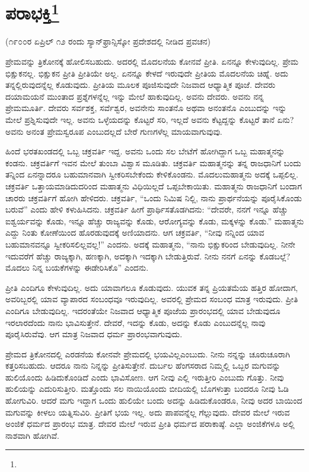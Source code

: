 
\chapter[ಪರಾಭಕ್ತಿ]{ಪರಾಭಕ್ತಿ\protect\footnote{}}

\begin{center}
(೧೯೦೦ರ ಏಪ್ರಿಲ್ ೧೨ ರಂದು ಸ್ಯಾನ್‌ಫ್ರಾನ್ಸಿಸ್ಕೋ ಪ್ರದೇಶದಲ್ಲಿ ನೀಡಿದ ಪ್ರವಚನ)
\end{center}

ಪ್ರೇಮವನ್ನು ತ್ರಿಕೋನಕ್ಕೆ ಹೋಲಿಸಬಹುದು. ಅದರಲ್ಲಿ ಮೊದಲನೆಯ ಕೋನವೆ ಪ್ರೀತಿ. ಏನನ್ನೂ ಕೇಳುವುದಿಲ್ಲ. ಪ್ರೇಮ ಭಿಕ್ಷುಕನಲ್ಲ. ಭಿಕ್ಷುಕನ ಪ್ರೀತಿ ಪ್ರೀತಿಯೇ ಅಲ್ಲ. ಏನನ್ನೂ ಕೇಳದೆ ಇರುವುದೇ ಪ್ರೀತಿಯ ಮೊದಲನೆಯ ಚಿಹ್ನೆ. ಅದು ತನ್ನಲ್ಲಿರುವುದನ್ನೆಲ್ಲ ಕೊಡುವುದು. ಪ್ರೀತಿಯ ಮೂಲಕ ಪೂಜಿಸುವುದೇ ನಿಜವಾದ ಆಧ್ಯಾತ್ಮಿಕ ಪೂಜೆ. ದೇವರು ದಯಾಮಯನೆ ಮುಂತಾದ ಪ್ರಶ್ನೆಗಳನ್ನೆಲ್ಲ ಇನ್ನು ಮೇಲೆ ಹಾಕುವುದಿಲ್ಲ. ಅವನು ದೇವರು. ಅವನು ನನ್ನ ಪ್ರೇಮಮೂರ್ತಿ. ದೇವರು ಸರ್ವಶಕ್ತ, ಸರ್ವೆಶ್ವರ, ಅವನೇನು ಸಾಂತನೊ ಅಥವಾ ಅನಂತನೊ ಎಂಬುದನ್ನು ಇನ್ನು ಮೇಲೆ ಪ್ರಶ್ನಿಸುವುದೇ ಇಲ್ಲ. ಅವನು ಒಳ್ಳೆಯದನ್ನು ಕೊಟ್ಟರೆ ಸರಿ, ಇಲ್ಲದೆ ಅವನು ಕೆಟ್ಟದ್ದನ್ನು ಕೊಟ್ಟರೆ ತಾನೆ ಏನು? ಅವನು ಅನಂತ ಪ್ರೇಮಸ್ವರೂಪ ಎಂಬುದಲ್ಲದೆ ಬೇರೆ ಗುಣಗಳೆಲ್ಲ ಮಾಯವಾಗುವುವು.

ಹಿಂದೆ ಭರತಖಂಡದಲ್ಲಿ ಒಬ್ಬ ಚಕ್ರವರ್ತಿ ಇದ್ದ. ಅವನು ಒಂದು ಸಲ ಬೇಟೆಗೆ ಹೋಗಿದ್ದಾಗ ಒಬ್ಬ ಮಹಾತ್ಮನನ್ನು ಕಂಡನು. ಚಕ್ರವರ್ತಿಗೆ ಇವನ ಮೇಲೆ ತುಂಬಾ ವಿಶ್ವಾಸ ಮೂಡಿತು. ಚಕ್ರವರ್ತಿ ಮಹಾತ್ಮನನ್ನು ತನ್ನ ರಾಜಧಾನಿಗೆ ಬಂದು ತನ್ನಿಂದ ಏನನ್ನಾದರೂ ಬಹುಮಾನವಾಗಿ ಸ್ವೀಕರಿಸಬೇಕೆಂದು ಕೇಳಿಕೊಂಡನು. ಮೊದಲು\break ಮಹಾತ್ಮನು ಅದಕ್ಕೆ ಒಪ್ಪಲಿಲ್ಲ. ಚಕ್ರವರ್ತಿ ಒತ್ತಾಯಮಾಡಿದುದರಿಂದ ಮಹಾತ್ಮನು ವಿಧಿಯಿಲ್ಲದೆ ಒಪ್ಪಬೇಕಾಯಿತು. ಮಹಾತ್ಮನು ರಾಜಧಾನಿಗೆ ಬಂದಾಗ ಚಾರರು ಚಕ್ರವರ್ತಿಗೆ ಹೋಗಿ ಹೇಳಿದರು. ಚಕ್ರವರ್ತಿ, “ಒಂದು ನಿಮಿಷ ನಿಲ್ಲಿ, ನಾನು ಪ್ರಾರ್ಥನೆಯನ್ನು ಪೂರೈಸಿಕೊಂಡು ಬರುವೆ'' ಎಂದು ಹೇಳಿ ಕಳುಹಿಸಿದನು. ಚಕ್ರವರ್ತಿ ಹೀಗೆ ಪ್ರಾರ್ಥಿಸತೊಡಗಿದನು: “ದೇವರೇ, ನನಗೆ ಇನ್ನೂ ಹೆಚ್ಚು ಐಶ್ವರ್ಯವನ್ನು ಕೊಡು, ಇನ್ನೂ ಹೆಚ್ಚು ರಾಜ್ಯವನ್ನು ಕೊಡು, ಆರೋಗ್ಯವನ್ನು ಕೊಡು, ಮಕ್ಕಳನ್ನು ಕೊಡು.” ಮಹಾತ್ಮನು ಎದ್ದು ನಿಂತು ಕೋಣೆಯಿಂದ ಹೊರಡುವುದಕ್ಕೆ ಅಣಿಯಾದನು. ಆಗ ಚಕ್ರವರ್ತಿ, “ನೀವು ನನ್ನಿಂದ ಯಾವ ಬಹುಮಾನವನ್ನೂ ಸ್ವೀಕರಿಸಲಿಲ್ಲವಲ್ಲ!'' ಎಂದನು. ಅದಕ್ಕೆ ಮಹಾತ್ಮನು, “ನಾನು ಭಿಕ್ಷುಕರಿಂದ ಬೇಡುವುದಿಲ್ಲ. ನೀನೇ ಇದುವರೆಗೆ ಹೆಚ್ಚು ರಾಜ್ಯಕ್ಕಾಗಿ, ಹಣಕ್ಕಾಗಿ, ಅದಕ್ಕಾಗಿ ಇದಕ್ಕಾಗಿ ಬೇಡುತ್ತಿರುವೆ. ನೀನು ನನಗೆ ಏನನ್ನು ಕೊಡಬಲ್ಲೆ? ಮೊದಲು ನಿನ್ನ ಬಯಕೆಗಳನ್ನು ಈಡೇರಿಸಿಕೊ” ಎಂದನು.

ಪ್ರೀತಿ ಎಂದಿಗೂ ಕೇಳುವುದಿಲ್ಲ. ಅದು ಯಾವಾಗಲೂ ಕೊಡುವುದು. ಯುವಕ ತನ್ನ ಪ್ರಿಯತಮೆಯ ಹತ್ತಿರ ಹೋದಾಗ, ಅವರಿಬ್ಬರಲ್ಲಿ ಯಾವ ವ್ಯಾಪಾರದ ಸಂಬಂಧವೂ ಇರುವುದಿಲ್ಲ. ಅವರಲ್ಲಿ ಪ್ರೇಮದ ಸಂಬಂಧ ಮಾತ್ರ ಇರುವುದು. ಪ್ರೀತಿ ಎಂದಿಗೂ ಬೇಡುವುದಿಲ್ಲ. ಇದರಂತೆಯೇ ನಿಜವಾದ ಆಧ್ಯಾತ್ಮಿಕ ಪೂಜೆಯ ಪ್ರಾರಂಭದಲ್ಲಿ ಯಾವ ಬೇಡುವುದೂ ಇರಲಾರದೆಂದು ನಾನು ಭಾವಿಸುತ್ತೇನೆ. ದೇವರೆ, ಇದನ್ನು ಕೊಡು, ಅದನ್ನು ಕೊಡು ಎಂಬುದನ್ನೆಲ್ಲ ನಾವು ಪೂರೈಸಿರುವೆವು. ಆಗ ಮಾತ್ರ ನಿಜವಾದ ಧರ್ಮ ಪ್ರಾರಂಭವಾಗುವುದು.

ಪ್ರೇಮದ ತ್ರಿಕೋನದಲ್ಲಿ ಎರಡನೆಯ ಕೋನವೇ ಪ್ರೇಮದಲ್ಲಿ ಭಯವಿಲ್ಲ\break ಎಂಬುದು. ನೀನು ನನ್ನನ್ನು ಚೂರುಚೂರಾಗಿ ಕತ್ತರಿಸಬಹುದು. ಆದರೂ ನಾನು ನಿನ್ನನ್ನು ಪ್ರೀತಿಸುತ್ತೇನೆ. ದುರ್ಬಲ ಹೆಂಗಸರಾದ ನಿಮ್ಮಲ್ಲಿ ಒಬ್ಬರ ಮಗುವನ್ನು ಹುಲಿಯೊಂದು ಹಿಡಿದುಕೊಂಡಿದೆ ಎಂದು ಭಾವಿಸೋಣ. ಆಗ ನೀವು ಎಲ್ಲಿ ಇರುತ್ತೀರಿ ಎಂಬುದು ಗೊತ್ತು. ನೀವು ಹುಲಿಯನ್ನು ಎದುರಿಸುತ್ತೀರಿ. ಮತ್ತೊಂದು ಸಲ ನಾಯಿಯೊಂದು ಬೀದಿಯಲ್ಲಿ ಬೊಗಳುತ್ತಾ ಬಂದರೂ ನೀವು ಓಡಿ ಹೋಗುವಿರಿ. ಆದರೆ ಮಗು ಇದ್ದಾಗ ಒಂದು ಹುಲಿಯೇ ಬಂದು ಅದನ್ನು ಹಿಡಿದುಕೊಂಡರೂ, ನೀವು ಅದರ ಬಾಯಿಂದ ಮಗುವನ್ನು ಕೀಳಲು ಯತ್ನಿಸುವಿರಿ. ಪ್ರೀತಿಗೆ ಭಯ ಇಲ್ಲ. ಅದು ಪಾಪವನ್ನೆಲ್ಲ ಗೆಲ್ಲುವುದು. ದೇವರ ಮೇಲೆ ಇರುವ ಅಂಜಿಕೆ ಧರ್ಮದ ಪ್ರಾರಂಭ ಮಾತ್ರ. ದೇವರ ಮೇಲೆ ಇರುವ ಪ್ರೀತಿ ಧರ್ಮದ ಪರಾಕಾಷ್ಠೆ. ಎಲ್ಲಾ ಅಂಜಿಕೆಗಳೂ ಅಲ್ಲಿ ನಾಶವಾಗಿ ಹೋಗಿವೆ.

